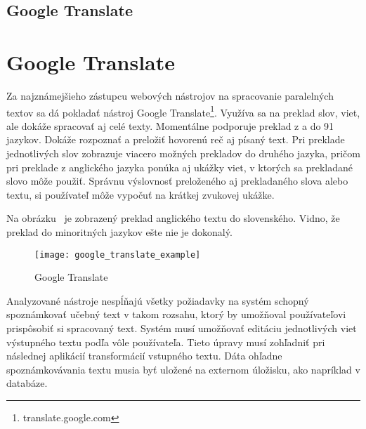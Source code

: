 %
%
{
	\subsection{Google Translate}
}
{
	\section{Google Translate}
}
Za najznámejšieho zástupcu webových nástrojov na spracovanie paralelných textov sa dá pokladať nástroj Google Translate\footnote{translate.google.com}. Využíva sa na preklad slov, viet, ale dokáže spracovať aj celé texty. Momentálne podporuje preklad z a do 91 jazykov. Dokáže rozpoznať a preložiť hovorenú reč aj písaný text. Pri preklade jednotlivých slov zobrazuje viacero možných prekladov do druhého jazyka, pričom pri preklade z anglického jazyka ponúka aj ukážky viet, v ktorých sa prekladané slovo môže použiť. Správnu výslovnosť preloženého aj prekladaného slova alebo textu, si používateľ môže vypočuť na krátkej zvukovej ukážke.

Na obrázku~ je zobrazený preklad anglického textu do slovenského. Vidno, že preklad do minoritných jazykov ešte nie je dokonalý.

\begin{figure}[H]
	\begin{center}\texttt{[image: google\_translate\_example]}\end{center}
	\caption[Google Translate]{Google Translate}\label{fig:google_translate_example}
\end{figure}

Analyzované nástroje nespĺňajú všetky požiadavky na systém schopný spoznámkovať učebný text v takom rozsahu, ktorý by umožňoval používateľovi prispôsobiť si spracovaný text. Systém musí umožňovať editáciu jednotlivých viet výstupného textu podľa vôle používateľa. Tieto úpravy musí zohľadniť pri následnej aplikácií transformácií vstupného textu. Dáta ohľadne spoznámkovávania textu musia byť uložené na externom úložisku, ako napríklad v databáze.

